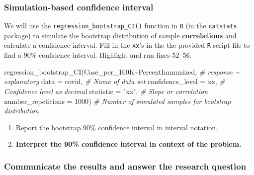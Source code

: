\documentclass[
]{report}
\newenvironment{Shaded}{\begin{snugshade}}{\end{snugshade}}
\newcommand{\AttributeTok}[1]{\textcolor[rgb]{0.77,0.63,0.00}{#1}}
\newcommand{\CommentTok}[1]{\textcolor[rgb]{0.56,0.35,0.01}{\textit{#1}}}
\newcommand{\DecValTok}[1]{\textcolor[rgb]{0.00,0.00,0.81}{#1}}
\newcommand{\FunctionTok}[1]{\textcolor[rgb]{0.00,0.00,0.00}{#1}}
\newcommand{\NormalTok}[1]{#1}
\newcommand{\SpecialCharTok}[1]{\textcolor[rgb]{0.00,0.00,0.00}{#1}}
\newcommand{\StringTok}[1]{\textcolor[rgb]{0.31,0.60,0.02}{#1}}
\begin{document}
\hypertarget{simulation-based-confidence-interval-1}{%
\subsubsection*{Simulation-based confidence interval}\label{simulation-based-confidence-interval-1}}

We will use the \texttt{regression\_bootstrap\_CI()} function in \texttt{R} (in the \texttt{catstats} package) to simulate the bootstrap distribution of sample \textbf{correlations} and calculate a confidence interval. Fill in the \texttt{xx}'s in the the provided \texttt{R} script file to find a 90\% confidence interval. Highlight and run lines 52--56.

\begin{Shaded}
\begin{Highlighting}[]
\FunctionTok{regression\_bootstrap\_CI}\NormalTok{(Case\_per\_100K}\SpecialCharTok{\textasciitilde{}}\NormalTok{PercentImmunized, }\CommentTok{\# response \textasciitilde{} explanatory}
   \AttributeTok{data =}\NormalTok{ covid, }\CommentTok{\# Name of data set}
   \AttributeTok{confidence\_level =}\NormalTok{ xx, }\CommentTok{\# Confidence level as decimal}
   \AttributeTok{statistic =} \StringTok{"xx"}\NormalTok{, }\CommentTok{\# Slope or correlation}
   \AttributeTok{number\_repetitions =} \DecValTok{1000}\NormalTok{) }\CommentTok{\# Number of simulated samples for bootstrap distribution}
\end{Highlighting}
\end{Shaded}

\begin{enumerate}
\def\labelenumi{\arabic{enumi}.}
\setcounter{enumi}{10}
\item
  Report the bootstrap 90\% confidence interval in interval notation.\\
  \vspace{0.5in}
\item
  \textbf{Interpret the 90\% confidence interval in context of the problem.}
  \vspace{0.8in}
\end{enumerate}

\hypertarget{communicate-the-results-and-answer-the-research-question-6}{%
\subsubsection*{Communicate the results and answer the research question}\label{communicate-the-results-and-answer-the-research-question-6}}
\end{document}
